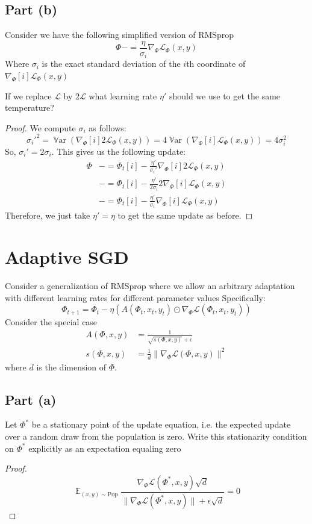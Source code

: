 \documentclass{amsart}
\newcommand{\cL}{\mathcal{L}}
\DeclareMathOperator{\Var}{\mathbb{V}ar}  %
\DeclareMathOperator{\ee}{\mathbb{E}}
\theoremstyle{definition}
\begin{document}
\subsection*{Part (b)} Consider we have the following simplified version of RMSprop 
\[
\Phi -= \frac{\eta}{\sigma_i} \nabla_\Phi \cL_\Phi(x, y)
\]
Where $\sigma_i$ is the exact standard deviation of the $i$th coordinate of $\nabla_\Phi[i] \cL_\Phi(x,y)$

If we replace $\cL$ by $2\cL$ what learning rate $\eta'$ should we use to get the same temperature?

\begin{proof}
    We compute $\sigma_i$ as follows:
    \[
    \sigma_i'^2 = \Var{(\nabla_\Phi[i] 2 \cL_\Phi(x, y))} = 4 \Var{(\nabla_\Phi[i] \cL_\Phi(x, y))} = 4 \sigma_i^2
    \]
    So, $\sigma_i' = 2 \sigma_i$. This gives us the following update:
    \begin{align*}
        \Phi &-= \Phi_t[i] - \frac{\eta'}{\sigma_i'} \nabla_\Phi[i] 2 \cL_\Phi(x, y)\\
        &-= \Phi_t[i] - \frac{\eta'}{2\sigma_i} 2 \nabla_\Phi[i] \cL_\Phi(x, y)\\
        &-= \Phi_t[i] - \frac{\eta'}{\sigma_i} \nabla_\Phi[i] \cL_\Phi(x, y)
    \end{align*}
    Therefore, we just take $\eta' = \eta$ to get the same update as before.
\end{proof}

\section*{Adaptive SGD} Consider a generalization of RMSprop where we allow an arbitrary adaptation with different learning rates for different parameter values
Specifically:
\[
\Phi_{t + 1} = \Phi_t - \eta (A(\Phi_t, x_t, y_t) \odot \nabla_\Phi \cL(\Phi_t, x_t, y_t))
\]
Consider the special case
\begin{align*}
    A(\Phi, x, y) &= \frac{1}{\sqrt{s(\Phi, x, y)} + \epsilon}\\
    s(\Phi, x, y) &= \frac1{d} \| \nabla_\Phi \cL(\Phi, x, y)\|^2
\end{align*}
where $d$ is the dimension of $\Phi$.

\subsection*{Part (a)}
Let $\Phi^\ast$ be a stationary point of the update equation, i.e. the expected update over a random draw from the population is zero.
Write this stationarity condition on $\Phi^\ast$ explicitly as an expectation equaling zero

\begin{proof}
    \[
    \ee_{(x, y) \sim \mathrm{Pop}} \frac{\nabla_\Phi \cL(\Phi^\ast, x, y)\sqrt{d}}{\|\nabla_\Phi \cL(\Phi^\ast, x, y)\|  + \epsilon\sqrt{d}} = 0
    \]
\end{proof}
\end{document}
